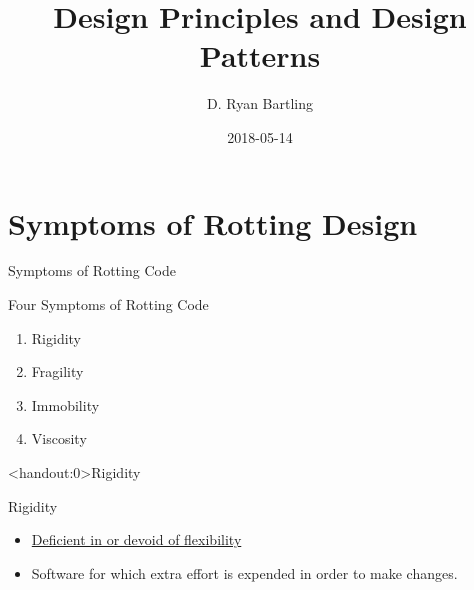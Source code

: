 \documentclass[xcolor=svgnames, handout]{beamer}
\title
    [Design Principles\hspace{2em}]
    {Design Principles and Design Patterns}
\author
    [Ryan Bartling]
    {D. Ryan Bartling}
\date
{2018-05-14}
\begin{document}
\maketitle

\section{Symptoms of Rotting Design}


\begin{frame}
    {Symptoms of Rotting Code}

    Four Symptoms of Rotting Code\pause

    \begin{enumerate}
        \item Rigidity\pause
        \item Fragility\pause
        \item Immobility\pause
        \item Viscosity\pause
    \end{enumerate}
\end{frame}


{%
%
\begin{frame}<handout:0>{Rigidity}
\end{frame}
}

{%
%
\begin{frame}{Rigidity}

    \begin{itemize}
        \item \href{https://www.merriam-webster.com/dictionary/rigid}
            {Deficient in or devoid of flexibility}
        \item<2-> Software for which extra effort is expended in order to make
            changes.
    \end{itemize}
\end{frame}
}

\end{document}
